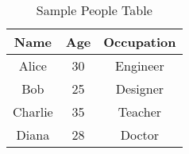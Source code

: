 \begin{table}[htbp]
\centering
\begin{tabular}{|c|c|c|}
\hline
\multicolumn{1}{X|}{Name} & Age & Occupation \\
\hline
Alice & 30 & Engineer \\
Bob & 25 & Designer \\
Charlie & 35 & Teacher \\
Diana & 28 & Doctor \\
\hline
\end{tabular}
\caption{Sample People Table}
\end{table}